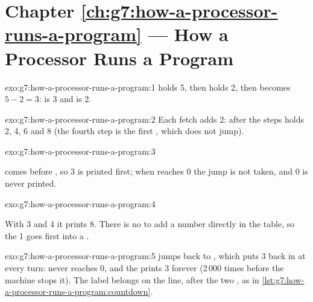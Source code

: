 \section*{Chapter \ref{ch:g7:how-a-processor-runs-a-program} --- How a Processor Runs a Program}

\begin{solution}{exo:g7:how-a-processor-runs-a-program:1}
 holds 5, then  holds 2, then  becomes $5 - 2 = 3$:
 is 3 and  is 2.
\end{solution}

\begin{solution}{exo:g7:how-a-processor-runs-a-program:2}
Each fetch adds 2: after the steps  holds 2, 4, 6 and 8 (the fourth
step is the first , which does not jump).
\end{solution}

\begin{solution}{exo:g7:how-a-processor-runs-a-program:3}
\label{out:g7:how-a-processor-runs-a-program:countdown}

 comes before , so 3 is printed first; when 
reaches 0 the jump is not taken, and 0 is never printed.
\end{solution}

\begin{solution}{exo:g7:how-a-processor-runs-a-program:4}
\label{lst:g7:how-a-processor-runs-a-program:sol-sum-plus-one}

With 3 and 4 it prints 8. There is no  to add a number directly in
the table, so the 1 goes first into a .
\end{solution}

\begin{solution}{exo:g7:how-a-processor-runs-a-program:5}
 jumps back to , which puts 3 back in
 at every turn:  never reaches 0, and the  prints 3
forever (2\,000 times before the machine stops it). The label belongs on the
 line, after the two , as in
\cref{lst:g7:how-a-processor-runs-a-program:countdown}.
\end{solution}

